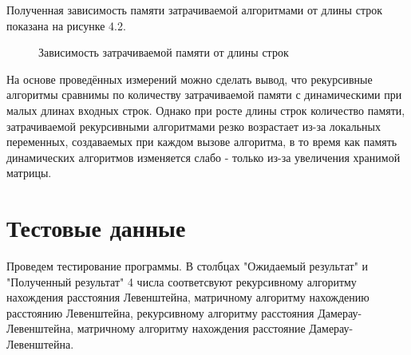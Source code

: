 \documentclass[12pt]{report}
\begin{document}
Полученная зависимость памяти затрачиваемой алгоритмами от длины строк показана на рисунке 4.2.

\begin{figure} [H]
	\caption{Зависимость затрачиваемой памяти от длины строк}
\end{figure}

\par
На основе проведённых измерений можно сделать вывод, что рекурсивные алгоритмы сравнимы по количеству затрачиваемой памяти с динамическими при малых длинах входных строк. Однако при росте длины строк количество памяти, затрачиваемой рекурсивными алгоритмами резко возрастает из-за локальных переменных, создаваемых при каждом вызове алгоритма, в то время как память динамических алгоритмов изменяется слабо - только из-за увеличения хранимой матрицы.




\section{Тестовые данные}

\par
Проведем тестирование программы. В столбцах "Ожидаемый результат" и "Полученный результат" 4 числа соответсвуют рекурсивному алгоритму нахождения расстояния Левенштейна, матричному алгоритму нахождению расстоянию Левенштейна, рекурсивному алгоритму расстояния Дамерау-Левенштейна, матричному алгоритму нахождения расстояние Дамерау-Левенштейна.
\end{document}
